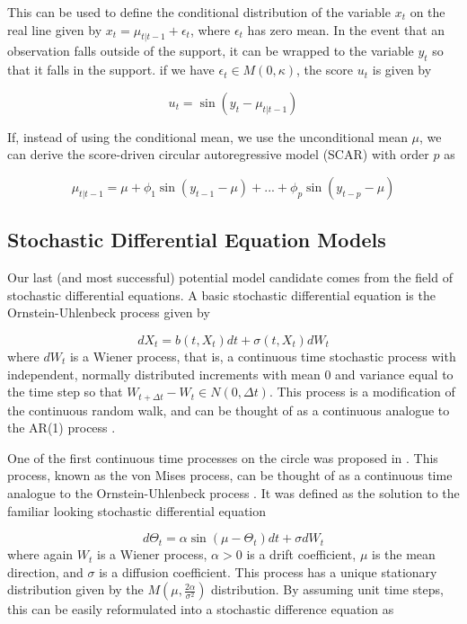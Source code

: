 \documentclass[11pt]{article}
\numberwithin{equation}{section}
\numberwithin{figure}{section}
\begin{document}
This can be used to define the conditional distribution of the variable $x_t$ on the real line given by $x_t = \mu_{t|t-1}+\epsilon_t$, where $\epsilon_t$ has zero mean. In the event that an observation falls outside of the support, it can be wrapped to the variable $y_t$ so that it falls in the support. if we have $\epsilon_t \in M(0,\kappa)$, the score $u_t$ is given by

\begin{equation}\label{eq:score mu}
u_t = \sin(y_t-\mu_{t|t-1})
\end{equation}

If, instead of using the conditional mean, we use the unconditional mean $\mu$, we can derive the score-driven circular autoregressive model (SCAR) with order $p$ as

\begin{equation}\label{eq:scar}
\mu_{t|t-1} = \mu+\phi_1 \sin(y_{t-1}-\mu)+...+\phi_p \sin(y_{t-p}-\mu)
\end{equation}

\subsection{Stochastic Differential Equation Models}

Our last (and most successful) potential model candidate comes from the field of stochastic differential equations. A basic stochastic differential equation is the Ornstein-Uhlenbeck process given by

\begin{equation}\label{eq:ornuhl}
d X_t = b(t, X_t)dt+\sigma(t,X_t)dW_t
\end{equation}
where $dW_t$ is a Wiener process, that is, a continuous time stochastic process with independent, normally distributed increments with mean $0$ and variance equal to the time step so that $W_{t+\Delta t}-W_t \in N(0,\Delta t)$. This process is a modification of the continuous random walk, and can be thought of as a continuous analogue to the AR(1) process \cite{oksendal}.

One of the first continuous time processes on the circle was proposed in \cite{Kent1}. This process, known as the von Mises process, can be thought of as a continuous time analogue to the Ornstein-Uhlenbeck process \cite{Garcia}. It was defined as the solution to the familiar looking stochastic differential equation

\begin{equation}\label{eq:vmp}
d \Theta_t = \alpha \sin(\mu - \Theta_t)dt+\sigma dW_t
\end{equation}
where again $W_t$ is a Wiener process, $\alpha>0$ is a drift coefficient, $\mu$ is the mean direction, and $\sigma$ is a diffusion coefficient. This process has a unique stationary distribution given by the $M(\mu, \frac{2\alpha}{\sigma^2})$ distribution. By assuming unit time steps, this can be easily reformulated into a stochastic difference equation as
\end{document}
